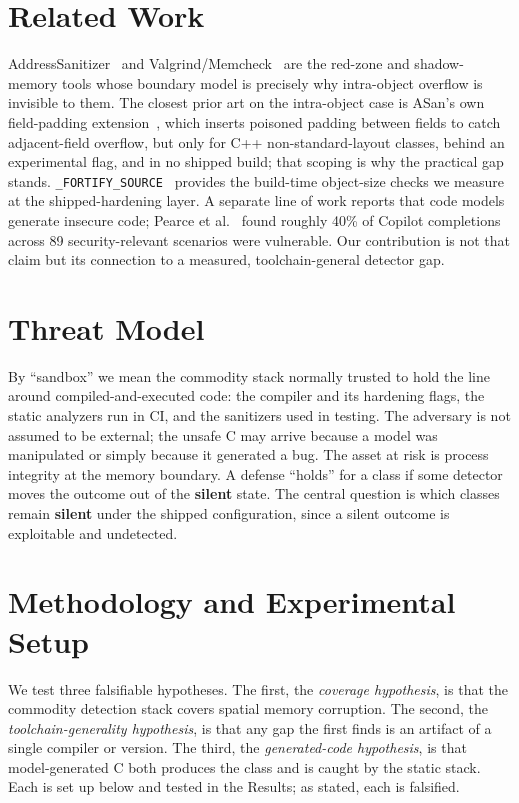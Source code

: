 \documentclass[11pt]{article}
\begin{document}
\section*{Related Work}
AddressSanitizer~\cite{asan} and Valgrind/Memcheck~\cite{valgrind} are the red-zone and
shadow-memory tools whose boundary model is precisely why intra-object overflow is invisible
to them. The closest prior art on the intra-object case is ASan's own field-padding
extension~\cite{asanintra}, which inserts poisoned padding between fields to catch
adjacent-field overflow, but only for C++ non-standard-layout classes, behind an experimental
flag, and in no shipped build; that scoping is why the practical gap stands.
\texttt{\_FORTIFY\_SOURCE}~\cite{fortify} provides the build-time object-size checks we
measure at the shipped-hardening layer. A separate line of work reports that code models
generate insecure code; Pearce et al.~\cite{copilot} found roughly 40\% of Copilot
completions across 89 security-relevant scenarios were vulnerable. Our contribution is not
that claim but its connection to a measured, toolchain-general detector gap.

\section*{Threat Model}
By ``sandbox'' we mean the commodity stack normally trusted to hold the line around
compiled-and-executed code: the compiler and its hardening flags, the static analyzers run in
CI, and the sanitizers used in testing. The adversary is not assumed to be external; the
unsafe C may arrive because a model was manipulated or simply because it generated a bug. The
asset at risk is process integrity at the memory boundary. A defense ``holds'' for a class if
some detector moves the outcome out of the \textbf{silent} state. The central question is
which classes remain \textbf{silent} under the shipped configuration, since a silent outcome
is exploitable and undetected.

\section*{Methodology and Experimental Setup}

We test three falsifiable hypotheses. The first, the \emph{coverage hypothesis}, is that the
commodity detection stack covers spatial memory corruption. The second, the
\emph{toolchain-generality hypothesis}, is that any gap the first finds is an artifact of a
single compiler or version. The third, the \emph{generated-code hypothesis}, is that
model-generated C both produces the class and is caught by the static stack. Each is set up
below and tested in the Results; as stated, each is falsified.
\end{document}
